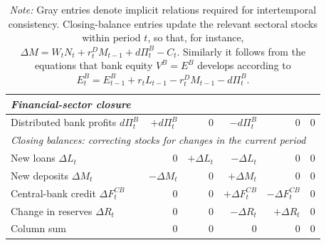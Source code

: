 \begin{table}[htbp]
\begin{tabular}{lrrrrr}

    \midrule
    \multicolumn{6}{l}{\textit{Financial-sector closure}}
    \\
    \midrule

    Distributed bank profits $d\Pi^B_t$
      & $+d\Pi^B_t$
      & $0$
      & $-d\Pi^B_t$
      & $0$
      & $0$
    \\

    \midrule
    \multicolumn{6}{l}{\textit{Closing balances: correcting stocks for changes in the current period}}
    \\
    \midrule

    New loans $\Delta L_t$
      & $0$
      & $+\Delta L_t$
      & $-\Delta L_t$
      & $0$
      & $0$
    \\

    New deposits $\Delta M_t$
      & $-\Delta M_t$
      & $0$
      & $+\Delta M_t$
      & $0$
      & $0$
    \\

    Central-bank credit $\Delta F^{CB}_t$
      & $0$
      & $0$
      & $+\Delta F^{CB}_t$
      & $-\Delta F^{CB}_t$
      & $0$
    \\

    Change in reserves $\Delta R_t$
      & $0$
      & $0$
      & $-\Delta R_t$
      & $+\Delta R_t$
      & $0$
    \\

    \midrule

    Column sum
      & $0$
      & $0$
      & $0$
      & $0$
      & $0$
    \\
    \bottomrule
  \end{tabular}
    \caption*{\footnotesize
    \textit{Note:} Gray entries denote implicit relations required for
    intertemporal consistency. Closing-balance entries update the relevant
    sectoral stocks within period $t$, so that, for instance, $\Delta M = W_t N_t + r_t^D M_{t-1}+ d \Pi^B_t -C_t$. Similarly it follows from the equations that bank equity $V^B=E^B$ develops according to $E^B_t = E_{t-1}^B + r_t L_{t-1} - r_t^D M_{t-1} - d\Pi^B_t$.}
\end{table}




